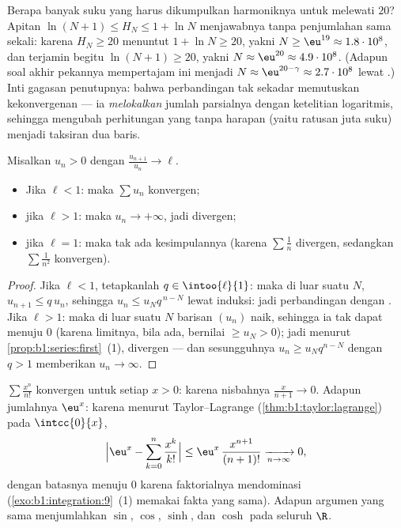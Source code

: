 \begin{example}\label{ex:b1:series:harmonicstack}
Berapa banyak suku yang harus dikumpulkan  harmoniknya untuk melewati $20$?
Apitan $\ln(N+1) \leq H_N \leq 1 + \ln N$ menjawabnya tanpa
penjumlahan sama sekali: karena $H_N \geq 20$ menuntut $1 + \ln N \geq 20$,
yakni $N \geq \eu^{19} \approx 1.8\cdot10^{8}$, dan terjamin
begitu $\ln(N + 1) \geq 20$, yakni $N \approx \eu^{20} \approx
4.9\cdot10^{8}$. (Adapun soal akhir pekannya mempertajam ini menjadi $N \approx
\eu^{20 - \gamma} \approx 2.7\cdot10^{8}$ lewat .)
Inti gagasan penutupnya: bahwa perbandingan  tak sekadar
memutuskan kekonvergenan --- ia \emph{melokalkan} jumlah parsialnya dengan
ketelitian logaritmis, sehingga mengubah perhitungan yang tanpa harapan
(yaitu ratusan juta suku) menjadi taksiran dua baris.
\end{example}

\begin{theorem}\label{thm:b1:series:ratio}
Misalkan $u_n > 0$ dengan $\frac{u_{n+1}}{u_n} \to \ell$.
\begin{itemize}
  \item Jika $\ell < 1$: maka $\sum u_n$ konvergen;
  \item jika $\ell > 1$: maka $u_n \to +\infty$, jadi divergen;
  \item jika $\ell = 1$: maka tak ada kesimpulannya (karena $\sum \frac1n$ divergen, sedangkan $\sum
        \frac{1}{n^2}$ konvergen).
\end{itemize}
\end{theorem}

\begin{proof}
Jika $\ell < 1$, tetapkanlah $q \in \intoo{\ell}{1}$: maka di luar suatu $N$,
$u_{n+1} \leq q\,u_n$, sehingga $u_n \leq u_N q^{\,n-N}$ lewat induksi:
jadi perbandingan dengan . Jika $\ell > 1$: maka di luar suatu $N$
barisan $(u_n)$ naik, sehingga ia tak dapat menuju $0$
(karena limitnya, bila ada, bernilai $\geq u_N > 0$); jadi menurut
\cref{prop:b1:series:first}~(1), divergen --- dan sesungguhnya $u_n
\geq u_N q^{n-N}$ dengan $q > 1$ memberikan $u_n \to \infty$.
\end{proof}

\begin{example}\label{ex:b1:series:ratio}
$\sum \frac{x^n}{n!}$ konvergen untuk setiap $x > 0$: karena nisbahnya
$\frac{x}{n+1} \to 0$. Adapun jumlahnya $\eu^x$: karena menurut Taylor--Lagrange
(\cref{thm:b1:taylor:lagrange}) pada $\intcc{0}{x}$,
\[
\Bigl| \eu^x - \sum_{k=0}^{n} \frac{x^k}{k!} \Bigr|
\leq \eu^{x}\, \frac{x^{n+1}}{(n+1)!} \xrightarrow[n\to\infty]{} 0 ,
\]
dengan batasnya menuju $0$ karena faktorialnya mendominasi
(\cref{exo:b1:integration:9}~(1) memakai fakta yang sama). Adapun argumen yang
sama menjumlahkan  $\sin$, $\cos$, $\sinh$, dan $\cosh$ pada seluruh
$\R$.
\end{example}

